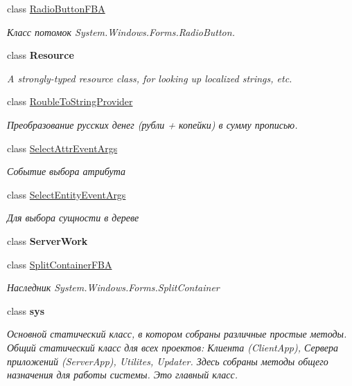 \begin{DoxyCompactItemize}
class \mbox{\hyperlink{class_f_b_a_1_1_radio_button_f_b_a}{Radio\+Button\+F\+BA}}
\begin{DoxyCompactList}\small\item\em Класс потомок System.\+Windows.\+Forms.\+Radio\+Button. \end{DoxyCompactList}\item 
class {\bfseries Resource}
\begin{DoxyCompactList}\small\item\em A strongly-\/typed resource class, for looking up localized strings, etc. \end{DoxyCompactList}\item 
class \mbox{\hyperlink{class_f_b_a_1_1_rouble_to_string_provider}{Rouble\+To\+String\+Provider}}
\begin{DoxyCompactList}\small\item\em Преобразование русских денег (рубли + копейки) в сумму прописью. \end{DoxyCompactList}\item 
class \mbox{\hyperlink{class_f_b_a_1_1_select_attr_event_args}{Select\+Attr\+Event\+Args}}
\begin{DoxyCompactList}\small\item\em Событие выбора атрибута \end{DoxyCompactList}\item 
class \mbox{\hyperlink{class_f_b_a_1_1_select_entity_event_args}{Select\+Entity\+Event\+Args}}
\begin{DoxyCompactList}\small\item\em Для выбора сущности в дереве \end{DoxyCompactList}\item 
class {\bfseries Server\+Work}
\item 
class \mbox{\hyperlink{class_f_b_a_1_1_split_container_f_b_a}{Split\+Container\+F\+BA}}
\begin{DoxyCompactList}\small\item\em Наследник System.\+Windows.\+Forms.\+Split\+Container \end{DoxyCompactList}\item 
class {\bfseries sys}
\begin{DoxyCompactList}\small\item\em Основной статический класс, в котором собраны различные простые методы. Общий статический класс для всех проектов\+: Клиента (Client\+App), Сервера приложений (Server\+App), Utilites, Updater. Здесь собраны методы общего назначения для работы системы. Это главный класс. \end{DoxyCompactList}\item 

\end{DoxyCompactItemize}
